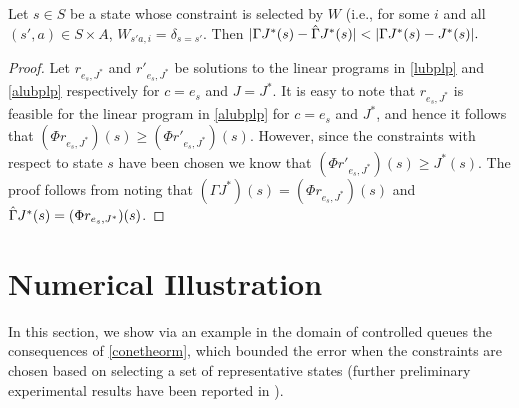 \documentclass[12pt,draftcls,onecolumn]{IEEEtran}
\begin{document}
\begin{comment}
\begin{note}
By bounding $\etmn=\norm{\Gamma J^*-J^*+J^*-\hg J^*}_{\mn}\leq 2\norm{J^*-\Phi r^*}_{\mn}+\norm{J^*-\hg J^*}_{\mn}$
(the inequality follows from \cref{bestbndmn}),
we can loosen the bounds in \cref{cmt2mn} and \cref{polthe} to
\begin{align}
\label{loose1}
\norm{J^*-\hj}_{1,c}&\leq\frac{c^\top\psi}{1-\beta_\psi}(10 \norm{J^*-\Phi r^*}_{\mn}
\nn\\&
+2\norm{J^*-\hg J^*}_{\mn}).\\
\label{loose2}
\norm{J^* - J_{\hu}}_{1,c}&\leq 2\left(\frac{c^\top \psi}{1-\beta_{\psi}}\right)^2 \,\big(10 \norm{J^*-\Phi r^*}_{\mn}
\nn\\&
+2\norm{J^*-\hg J^*}_{\mn}\big).
\end{align}
Here the term $||J^*-\hg J^*||$ in \eqref{loose1} and \eqref{loose2} captures the error due to the use of both $\Phi$ and $W$. Though, \eqref{loose1} and \eqref{loose2} might be loser bounds than \eqref{finalbndmn} and \eqref{polthebnd} respectively, the advantage of this bound is that it captures the error due to function approximation as well as constraint reduction in a direct manner.
\end{note}
\end{comment}
\begin{theorem}
Let $s\in S$ be a state whose constraint is selected by $W$ (i.e., for some $i$ and all $(s',a)\in S\times A$,
$W_{s'a,i}=\delta_{s=s'}$.
Then
$
|\Gamma J^*(s)-\hg J^*(s)|<|\Gamma J^*(s)-J^*(s)|.
$
\end{theorem}

\begin{proof}
Let $r_{e_s,J^*}$ and ${r}'_{e_s,J^*}$ be solutions to the linear programs in \eqref{lubplp} and \eqref{alubplp} respectively for $c=e_s$ and $J=J^*$. It is easy to note that $r_{e_s,J^*}$ is feasible for the linear program in \eqref{alubplp} for $c=e_s$ and $J^*$, and hence it follows that $(\Phi r_{e_s,J^*})(s)\geq (\Phi {r}'_{e_s,J^*})(s)$. However, since the constraints with respect to state $s$ have been chosen we know that $(\Phi {r}'_{e_s,J^*})(s)\geq J^*(s)$. The proof follows from noting that $(\Gamma J^*)(s)=(\Phi r_{e_s,J^*})(s)$ and $\hat{\Gamma} J^*(s)=(\Phi {r}_{e_s,J^*})(s)$.
\end{proof}
\fi


\section{Numerical Illustration}
In this section, we show via an example in the domain of controlled queues the consequences of \cref{conetheorm},
which bounded the error when the constraints are chosen based on selecting a set of representative states
(further preliminary experimental results have been reported in \cite{aaaipaper}).
\end{document}
